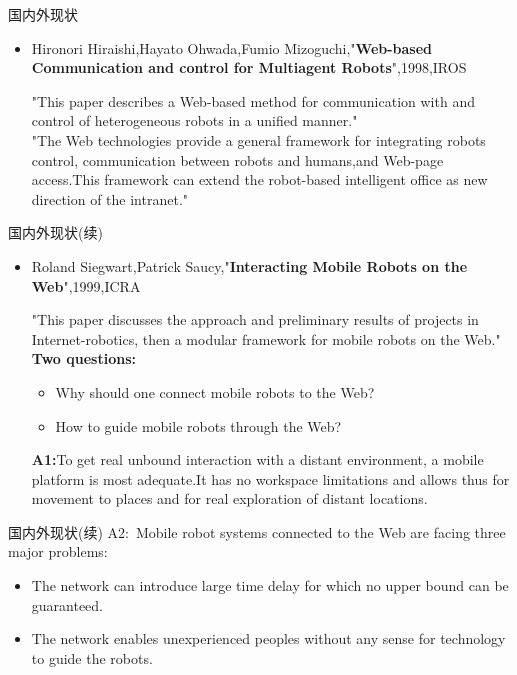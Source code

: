 \documentclass[CJK]{beamer}
\begin{document}
\begin{CJK*}{UTF8}{gkai}
\begin{frame}{国内外现状}
\begin{itemize}
\begin{block}{}
	\end{block}
	\item Hironori Hiraishi,Hayato Ohwada,Fumio Mizoguchi,"{\bf Web-based Communication and control for Multiagent Robots}",1998,IROS
	\begin{block}{}
	"This paper describes a Web-based method for communication with and control of heterogeneous robots in a unified manner."\\
	"The Web technologies provide a general framework for integrating robots control, communication between robots and humans,and Web-page access.This framework can extend the robot-based intelligent office as new direction of the intranet."
	\end{block}
\end{itemize}
\end{frame}
\begin{frame}{ 国内外现状(续)}
\begin{itemize}
	\item Roland Siegwart,Patrick Saucy,"{\bf Interacting Mobile Robots on the Web}",1999,ICRA
	\begin{block}{}
	"This paper discusses the approach and preliminary results of projects in Internet-robotics, then a modular framework for mobile robots on the Web."\\
	{\bf Two questions:}
	\begin{itemize}
		\item Why should one connect mobile robots to the Web?
		\item How to guide mobile robots through the Web?
	\end{itemize}
{\bf A1:}To get real unbound interaction with a distant environment, a mobile platform is most adequate.It has no workspace limitations and allows thus for movement to places and for real exploration of distant locations.\\
	\end{block}
\end{itemize}
\end{frame}
\begin{frame}{国内外现状(续)}
A2:\ Mobile robot systems connected to the Web are facing three major problems:\\
\begin{itemize}
	\item The network can introduce large time delay for which no upper bound can be guaranteed.
	\item The network enables unexperienced peoples without any sense for technology to guide the robots.

\end{itemize}
\end{frame}
\end{CJK*}
\end{document}
